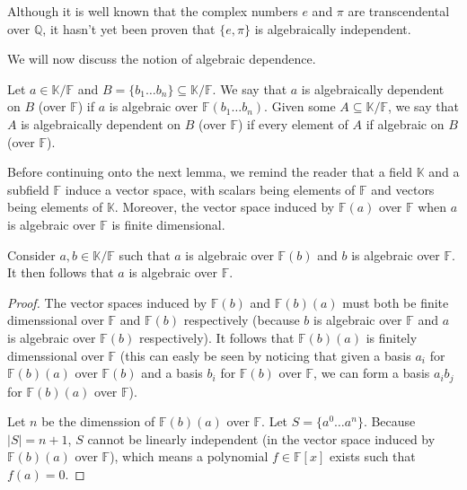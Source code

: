 Although it is well known that the complex numbers $e$ and $\pi$ are transcendental over $\mathbb{Q}$, it hasn't yet been proven that $\{e, \pi \}$ is algebraically independent.

We will now discuss the notion of algebraic dependence.

\begin{defn}
	Let $a \in \mathbb K / \mathbb F$ and $B = \{b _1 \ldots b _n \} \subseteq  \mathbb K / \mathbb F$. We say that $a$ is algebraically dependent on $B$ (over $ \mathbb{F} $) if $a$ is algebraic over $\mathbb F(b _1 \ldots b _n )$. Given some $A \subseteq  \mathbb K / \mathbb{F} $, we say that $A$ is algebraically dependent on $B$ (over $\mathbb{F} $) if every element of $A$ if algebraic on $B$ (over $\mathbb{F} $).
\end{defn}

Before continuing onto the next lemma, we remind the reader that a field $\mathbb K$ and a subfield $\mathbb{F}$ induce a vector space, with scalars being elements of $\mathbb{F} $ and vectors being elements of $\mathbb K$. Moreover, the vector space induced by $\mathbb{F} (a)$ over $\mathbb{F} $ when $a$ is algebraic over $\mathbb{F} $ is finite dimensional.

\begin{lemma}\label{lem:algebraic-transitivity}
	Consider $a, b \in \mathbb K / \mathbb{F} $ such that $a$ is algebraic over $\mathbb{F}(b) $ and $b$ is algebraic over $\mathbb{F}$. It then follows that $a$ is algebraic over $\mathbb{F}$.
\end{lemma}

\begin{proof}
	The vector spaces induced by $\mathbb{F} (b)$ and $\mathbb{F} (b)(a)$ must both be finite dimenssional over $\mathbb{F} $ and $\mathbb{F} (b)$ respectively (because $b$ is algebraic over $\mathbb{F} $ and $a$ is algebraic over $\mathbb{F} (b)$ respectively). It follows that $\mathbb{F} (b)(a)$ is finitely dimenssional over $\mathbb{F}$ (this can easly be seen by noticing that given a basis $a _i $ for $\mathbb{F} (b)(a)$ over $\mathbb{F} (b)$ and a basis $b _i $ for $\mathbb{F} (b)$ over $\mathbb{F} $, we can form a basis $a _i b _j $ for $\mathbb{F} (b)(a)$ over $\mathbb{F} $).

	Let $n$ be the dimenssion of $\mathbb{F} (b)(a)$ over $\mathbb{F} $. Let $S = \{a ^0 \ldots a ^n \}$. Because $|S| = n + 1$, $S$ cannot be linearly independent (in the vector space induced by $\mathbb{F} (b)(a)$ over $\mathbb{F} $), which means a polynomial $f \in \mathbb{F} [x]$ exists such that $f(a) = 0$.
\end{proof}


